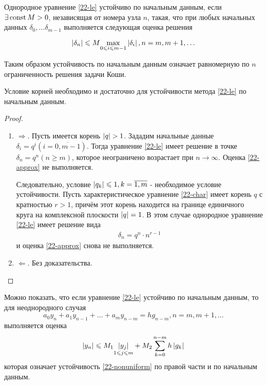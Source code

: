 \begin{definition}
  Однородное уравнение \eqref{22-le} устойчиво по начальным данным, если $\exists \operatorname{\text{const}}
  M > 0$, независящая от номера узла $n$, такая, что при любых начальных данных
  $\delta_0, \ldots \delta_{m - 1}$ выполняется следующая оценка решения
\end{definition}
\begin{equation}
  \label{22-approx}
  \left\lvert \delta_n \right\rvert \leqslant M \underset{0 \leqslant i \leqslant m - 1}{\max}\left\lvert \delta_i \right\rvert,
  n = m, m + 1, \ldots
\end{equation}

Таким образом устойчивость по начальным данным означает равномерную по $n$ ограниченность
решения задачи Коши.

\begin{theorem}
  Условие корней необходимо и достаточно для устойчивости метода \eqref{22-le} по
  начальным данным.
\end{theorem}
\begin{proof}

  \begin{enumerate}
    \item $\Rightarrow$. Пусть имеется корень $\left\lvert q \right\rvert > 1$. Зададим начальные данные
    $\delta_i = q^i (i = \overline{0, m - 1})$. Тогда уравнение \eqref{22-le} имеет
    решение в точке $\delta_n = q^n(n \geqslant m)$, которое неограничено возрастает при
    $n \to \infty$. Оценка \eqref{22-approx} не выполняется.

    Следовательно, условие $\left\lvert q_k \right\rvert \leqslant 1, k = \overline{1, m}$ - необходимое
    условие устойчивости. Пусть характеристическое уравнение \eqref{22-char} имеет корень
    $q$ с кратностью $r > 1$, причём этот корень находится на границе единичного круга на
    комплексной плоскости $\left\lvert q \right\rvert = 1$. В этом случае однородное уравнение
    \eqref{22-le}
    имеет решение вида
    \begin{align*}
      \delta_n = q^n\cdot n^{r - 1}
    \end{align*}
    и оценка \eqref{22-approx} снова не выполняется.
    \item $\Leftarrow$. Без доказательства.
  \end{enumerate}
\end{proof}

Можно показать, что если уравнение \eqref{22-le} устойчиво по начальным данным, то для
неоднородного случая
\begin{equation}
  \label{22-nonuniform}
  a_0y_n + a_1y_{n - 1} + \ldots + a_my_{n - m} = hg_{n - m}, n = m, m + 1, \ldots
\end{equation}
выполняется оценка
\begin{equation}
  \left\lvert y_n \right\rvert \leqslant M_1\underset{1 \leqslant j \leqslant m}{\left\lvert y_j \right\rvert} +
  M_2\sum\limits_{k = 0}^{n - m}h\left\lvert g_k \right\rvert
\end{equation}
которая означает устойчивость \eqref{22-nonuniform} по правой части и по начальным
данным.
